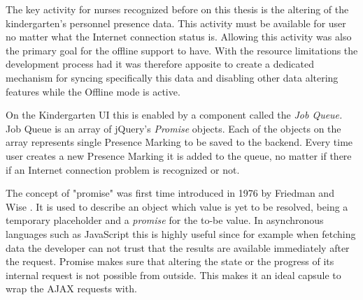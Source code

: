 
The key activity for nurses recognized before on this thesis is the altering of the kindergarten's personnel presence data. This activity must be available for user no matter what the Internet connection status is. Allowing this activity was also the primary goal for the offline support to have. With the resource limitations the development process had it was therefore apposite to create a dedicated mechanism for syncing specifically this data and disabling other data altering features while the Offline mode is active. %

On the Kindergarten UI this is enabled by a component called the \textit{Job Queue.} Job Queue is an array of jQuery's \textit{Promise} objects. Each of the objects on the array represents single Presence Marking to be saved to the backend. Every time user creates a new Presence Marking it is added to the queue, no matter if there if an Internet connection problem is recognized or not.


The concept of "promise" was first time introduced in 1976 by Friedman and Wise \cite{friedman_impact_1976}. It is used to describe an object which value is yet to be resolved, being a temporary placeholder and a \textit{promise} for the to-be value. In asynchronous languages such as JavaScript this is highly useful since for example when fetching data the developer can not trust that the results are available immediately after the request. Promise makes sure that altering the state or the progress of its internal request is not possible from outside. This makes it an ideal capsule to wrap the AJAX requests with. \cite{_deferred.promise_????} %

